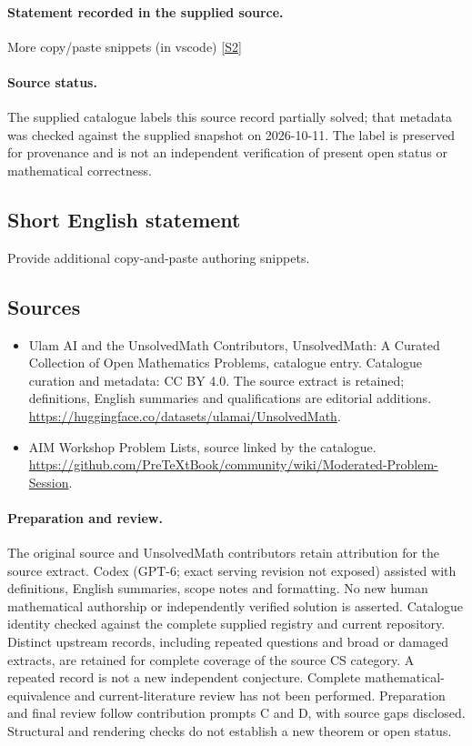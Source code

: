 \documentclass[11pt]{article}
\begin{document}
\paragraph{Statement recorded in the supplied source.}
More copy/paste snippets (in vscode) \href{https://github.com/PreTeXtBook/community/wiki/Moderated-Problem-Session}{[S2]}
\paragraph{Source status.}
The supplied catalogue labels this source record partially solved; that metadata was checked against the supplied snapshot on 2026-10-11. The label is preserved for provenance and is not an independent verification of present open status or mathematical correctness.
\subsection{Short English statement}
Provide additional copy-and-paste authoring snippets.
\subsection{Sources}
\begin{itemize}
\item[S1] Ulam AI and the UnsolvedMath Contributors, UnsolvedMath: A Curated Collection of Open Mathematics Problems, catalogue entry. Catalogue curation and metadata: CC BY 4.0. The source extract is retained; definitions, English summaries and qualifications are editorial additions.
\url{https://huggingface.co/datasets/ulamai/UnsolvedMath}.
\item[S2] AIM Workshop Problem Lists, source linked by the catalogue.
\url{https://github.com/PreTeXtBook/community/wiki/Moderated-Problem-Session}.
\end{itemize}
\paragraph{Preparation and review.}
The original source and UnsolvedMath contributors retain attribution for the source extract. Codex (GPT-6; exact serving revision not exposed) assisted with definitions, English summaries, scope notes and formatting. No new human mathematical authorship or independently verified solution is asserted. Catalogue identity checked against the complete supplied registry and current repository. Distinct upstream records, including repeated questions and broad or damaged extracts, are retained for complete coverage of the source CS category. A repeated record is not a new independent conjecture. Complete mathematical-equivalence and current-literature review has not been performed. Preparation and final review follow contribution prompts C and D, with source gaps disclosed. Structural and rendering checks do not establish a new theorem or open status.
\label{end:statement}
\end{document}
